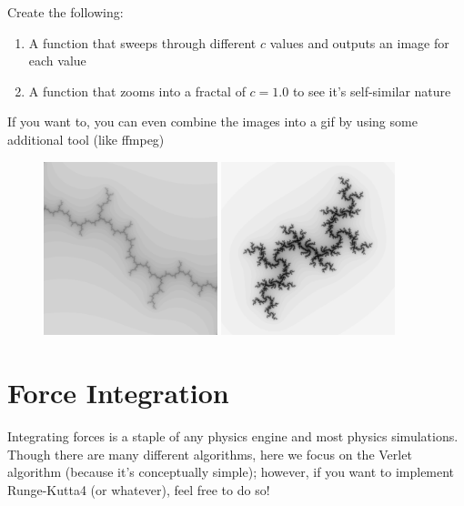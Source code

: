 \documentclass[11pt]{article}
\begin{document}
Create the following: 
\begin{enumerate}
\item A function that sweeps through different $c$ values and outputs an image for each value
\item A function that zooms into a fractal of $c=1.0$ to see it's self-similar nature
\end{enumerate}

If you want to, you can even combine the images into a gif by using some additional tool (like ffmpeg)
\begin{figure}
\begin{center}
\includegraphics[width=0.45\textwidth]{fractal_zoom00030.png}
\includegraphics[width=0.45\textwidth]{c_scan00030.png}
\end{center}
\end{figure}

\newpage
\section*{Force Integration}
Integrating forces is a staple of any physics engine and most physics simulations. Though there are many different algorithms, here we focus on the Verlet algorithm (because it's conceptually simple); however, if you want to implement Runge-Kutta4 (or whatever), feel free to do so!
\end{document}
